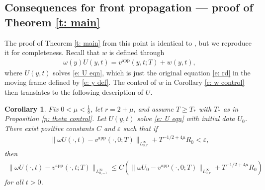 \documentclass[11pt]{article}
\newcommand{\eps}{\varepsilon}
\newtheorem{corollary}[prop]{Corollary}
\numberwithin{equation}{section}
\numberwithin{prop}{section}
\begin{document}
\subsection{Consequences for front propagation --- proof of Theorem \ref{t: main}}
The proof of Theorem \ref{t: main} from this point is identical to \cite[Section 6]{CAMS}, but we reproduce it for completeness. Recall that $w$ is defined through
\begin{align}
\omega (y) U(y,t) = v^\mathrm{app}(y,t; T) + w(y,t),
\end{align}
where $U(y,t)$ solves \eqref{e: U eqn}, which is just the original equation \eqref{e: rd} in the moving frame defined by \eqref{e: y def}. The control of $w$ in Corollary \ref{c: w control} then translates to the following description of $U$.
\begin{corollary}\label{c: U control}
	Fix $0 < \mu < \frac{1}{8}$, let $r = 2 + \mu$, and assume $T \geq T_*$ with $T_*$ as in Proposition \ref{p: theta control}. Let $U(y,t)$ solve \eqref{e: U eqn} with initial data $U_0$. There exist positive constants $C$ and $\eps$ such that if 
	\begin{align}
	\| \omega U(\cdot, t) - v^\mathrm{app} (\cdot, 0; T) \|_{L^\infty_{0, r}} + T^{-1/2 + 4\mu} R_0 < \eps, 
	\end{align}
	then 
	\begin{align}
	\| \omega U(\cdot, t) - v^\mathrm{app}(\cdot, t; T) \|_{L^\infty_{0, -1}} \leq C \left( \| \omega U_0 - v^\mathrm{app}(\cdot, 0; T) \|_{L^\infty_{0, r}} + T^{-1/2 + 4 \mu} R_0 \right) 
	\end{align}
	for all $t > 0$. 
\end{corollary}
\end{document}
